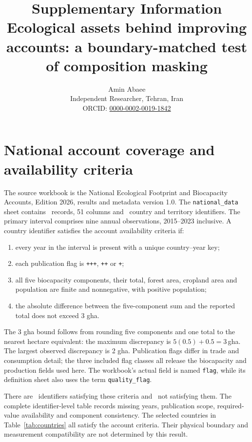 \documentclass[11pt,a4paper]{article}
\title{Supplementary Information\\\large Ecological assets behind improving accounts: a boundary-matched test of composition masking}
\author{Amin Abaee\\\small Independent Researcher, Tehran, Iran\\\small ORCID: \href{https://orcid.org/0000-0002-0019-1842}{0000-0002-0019-1842}}
\date{}
\begin{document}
\maketitle

\section{National account coverage and availability criteria}

The source workbook is the National Ecological Footprint and Biocapacity Accounts, Edition 2026, results and metadata version 1.0. The \texttt{national\_data} sheet contains \NationalRows\ records, 51 columns and \CountryIDs\ country and territory identifiers. The primary interval comprises nine annual observations, 2015--2023 inclusive. A country identifier satisfies the account availability criteria if:
\begin{enumerate}
\item every year in the interval is present with a unique country--year key;
\item each publication flag is \texttt{+++}, \texttt{++} or \texttt{+};
\item all five biocapacity components, their total, forest area, cropland area and population are finite and nonnegative, with positive population;
\item the absolute difference between the five-component sum and the reported total does not exceed 3 gha.
\end{enumerate}
The 3 gha bound follows from rounding five components and one total to the nearest hectare equivalent: the maximum discrepancy is $5(0.5)+0.5=3$\,gha. The largest observed discrepancy is 2 gha. Publication flags differ in trade and consumption detail; the three included flag classes all release the biocapacity and production fields used here. The workbook's actual field is named \texttt{flag}, while its definition sheet also uses the term \texttt{quality\_flag}.

There are \AccountPass\ identifiers satisfying these criteria and \AccountFail\ not satisfying them. The complete identifier-level table records missing years, publication scope, required-value availability and component consistency. The selected countries in Table~\ref{tab:countries} all satisfy the account criteria. Their physical boundary and measurement compatibility are not determined by this result.
\end{document}
